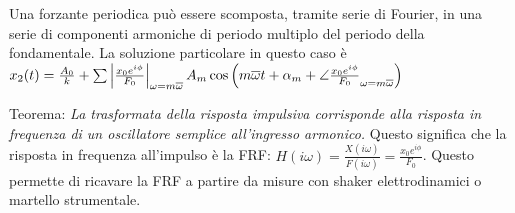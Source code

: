 
Una forzante periodica può essere scomposta, tramite serie di Fourier, in una serie di componenti armoniche di periodo multiplo del periodo della fondamentale. La soluzione particolare in questo caso è \(x_2(t) = \frac{A_0}{k} + \sum \left|\frac{x_0 e^{i\phi}}{F_0}\right|_{\omega=m\overline{\omega}} A_m \cos{\left( m\overline{\omega} t + \alpha_m + \angle{\frac{x_0 e^{i\phi}}{F_0}}_{\omega=m\overline{\omega}} \right)}\)

Teorema: \textit{La trasformata della risposta impulsiva corrisponde alla risposta in frequenza di un oscillatore semplice all'ingresso armonico.}
Questo significa che la risposta in frequenza all'impulso è la FRF: \(H(i\omega) = \frac{X(i\omega)}{F(i\omega)} = \frac{x_0 e^{i\phi}}{F_0}\).
Questo permette di ricavare la FRF a partire da misure con shaker elettrodinamici o martello strumentale.




